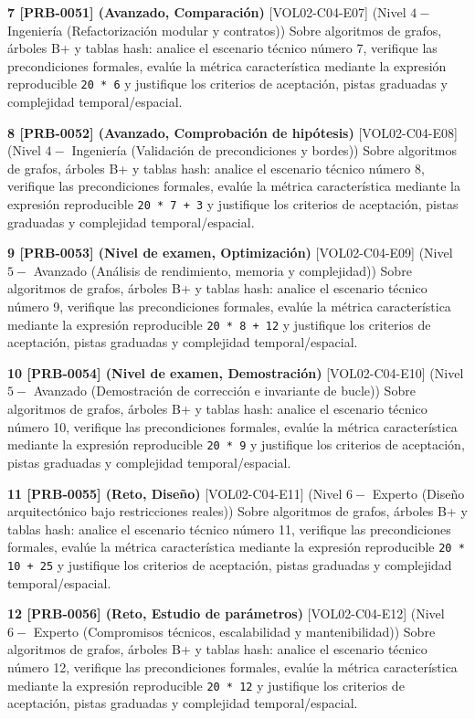 \documentclass{book}
\begin{document}
\begin{tcolorbox}[title={Ejercicios}, studiumworked, breakable]
\noindent\textbf{7 [PRB-0051] (Avanzado, Comparación)}
[VOL02-C04-E07] (Nivel \(4 -\) Ingeniería (Refactorización modular y contratos)) Sobre algoritmos de grafos, árboles B+ y tablas hash: analice el escenario técnico número 7, verifique las precondiciones formales, evalúe la métrica característica mediante la expresión reproducible \texttt{20 * 6} y justifique los criterios de aceptación, pistas graduadas y complejidad temporal/espacial.

\noindent\textbf{8 [PRB-0052] (Avanzado, Comprobación de hipótesis)}
[VOL02-C04-E08] (Nivel \(4 -\) Ingeniería (Validación de precondiciones y bordes)) Sobre algoritmos de grafos, árboles B+ y tablas hash: analice el escenario técnico número 8, verifique las precondiciones formales, evalúe la métrica característica mediante la expresión reproducible \texttt{20 * 7 + 3} y justifique los criterios de aceptación, pistas graduadas y complejidad temporal/espacial.

\noindent\textbf{9 [PRB-0053] (Nivel de examen, Optimización)}
[VOL02-C04-E09] (Nivel \(5 -\) Avanzado (Análisis de rendimiento, memoria y complejidad)) Sobre algoritmos de grafos, árboles B+ y tablas hash: analice el escenario técnico número 9, verifique las precondiciones formales, evalúe la métrica característica mediante la expresión reproducible \texttt{20 * 8 + 12} y justifique los criterios de aceptación, pistas graduadas y complejidad temporal/espacial.

\noindent\textbf{10 [PRB-0054] (Nivel de examen, Demostración)}
[VOL02-C04-E10] (Nivel \(5 -\) Avanzado (Demostración de corrección e invariante de bucle)) Sobre algoritmos de grafos, árboles B+ y tablas hash: analice el escenario técnico número 10, verifique las precondiciones formales, evalúe la métrica característica mediante la expresión reproducible \texttt{20 * 9} y justifique los criterios de aceptación, pistas graduadas y complejidad temporal/espacial.

\noindent\textbf{11 [PRB-0055] (Reto, Diseño)}
[VOL02-C04-E11] (Nivel \(6 -\) Experto (Diseño arquitectónico bajo restricciones reales)) Sobre algoritmos de grafos, árboles B+ y tablas hash: analice el escenario técnico número 11, verifique las precondiciones formales, evalúe la métrica característica mediante la expresión reproducible \texttt{20 * 10 + 25} y justifique los criterios de aceptación, pistas graduadas y complejidad temporal/espacial.

\noindent\textbf{12 [PRB-0056] (Reto, Estudio de parámetros)}
[VOL02-C04-E12] (Nivel \(6 -\) Experto (Compromisos técnicos, escalabilidad y mantenibilidad)) Sobre algoritmos de grafos, árboles B+ y tablas hash: analice el escenario técnico número 12, verifique las precondiciones formales, evalúe la métrica característica mediante la expresión reproducible \texttt{20 * 12} y justifique los criterios de aceptación, pistas graduadas y complejidad temporal/espacial.
\end{tcolorbox}
\end{document}

